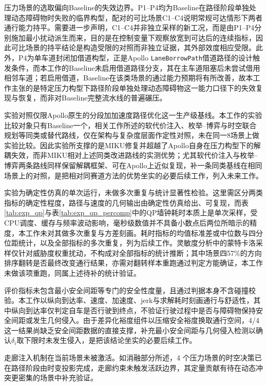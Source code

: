 \documentclass[a4paper,11pt]{ctexart}
\theoremstyle{definition}
\begin{document}
压力场景的选取偏向Baseline的失效边界。P1--P4均为Baseline在路径阶段单独处理动态障碍物时失败的临界构型，配对的可比场景C1--C4说明常规可达情形下两者通行能力持平。需要进一步声明，C1--C4并非独立采样的新工况，而是由P1--P4分别施加最小扰动派生而来，目的是在控制变量下观察放宽到可达后的连续指标，因此可比场景的持平结论是构造受限的对照而非独立证据，其外部效度相应受限。此外，P4为单车道封闭加借道构型，正是Apollo \texttt{LaneBorrowPath}借道路径的设计触发条件，而本工作的Baseline未启用借道路径分支，其在主车道阻塞后未尝试借用相邻车道；若启用借道，Baseline在该类场景的通过能力预期将有所改善，故本工作主张的是特定压力构型下路径阶段单独处理动态障碍物这一能力口径下的失效复现与恢复，而非对Baseline完整流水线的普遍碾压。

实验对照仅限Apollo原生的分段加加速度路径优化这一生产级基线。本工作的实验比较对象只有Baseline一个，相关工作所述的软代价注入、枚举--博弈与时空联合规划等同类或替代路线，仅在架构与复杂度层面作定性对照，未在同一8场景上做实验比较。因此实验所支撑的是MIKU修复并超越了Apollo自身在压力构型下的解耦失效，而非MIKU相对上述同类改进路线的实测优势；尤其软代价注入与枚举--博弈两条路线同样保留解耦框架、可在Apollo上近似复现，补一条同类基线在相同场景上的对照，是把相对同赛道方法的优势坐实的必要后续工作，列入未来工作。

实验为确定性仿真的单次运行，未做多次重复与统计显著性检验。这里需区分两类指标的确定性程度，路径与速度的几何输出由确定性仿真给出、可复现，而表\ref{tab:exp_qp}与表\ref{tab:exp_qp_percomp}中的QP墙钟耗时本质上是单次采样，受CPU调度、缓存与频率波动影响，毫秒级数值并不具备小数点后两位所暗示的精度，本工作未对其做多次重复与方差刻画。耗时指标的均值标准差或中位数与四分位距统计，以及全部指标的多次重复，列为后续工作。灵敏度分析中的蒙特卡洛采样仅针对威胁度权重扰动，不构成对全部指标的统计推断；其中场景四57\%的方向排序翻转是否最终改变通行结果，亦需对翻转样本重跑通过判定方能确证，本工作未做该项重跑，同属上述待补的统计验证。

评价指标未包含最小安全间距等专门的安全性度量，且通过判据本身不含碰撞校验。本工作以纵向到达率、速度、加速度、jerk与求解耗时刻画通行与舒适性，其中纵向到达率仅判定自车是否行驶到终点，不验证行驶过程中是否与障碍物保持安全间距或发生几何侵入。由于差异化裕度组件以压缩安全裕度换取通行空间，4/4 这一结果尚缺乏安全间距数据的直接支撑，补充最小安全间距与几何侵入检测以确认$\delta_i$取下限时未发生侵入，是把该结论坐实的必要后续工作。

走廊注入机制在当前场景未被激活。如消融部分所述，4 个压力场景的时空决策已在路径阶段由时变投影完成，走廊约束未触发活跃边界，其定量贡献有待在动态冲突更密集的场景中补充验证。
\end{document}
